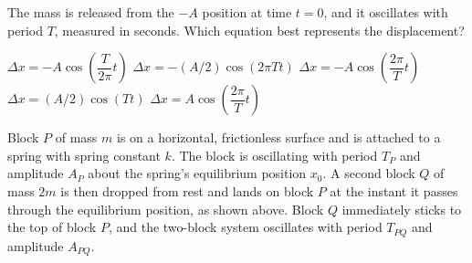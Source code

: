 \documentclass{../../../oss-ap12ibhl-print}
\begin{document}
\begin{questions}
  \question The mass is released from the $-A$ position at time $t=0$, and it
  oscillates with period $T$, measured in seconds. Which equation best
  represents the displacement?
  \label{four}
  \begin{choices}
    \choice $\Delta x = -A\cos\left(\dfrac{T}{2\pi}t\right)$
    \choice $\Delta x = -(A/2)\cos(2\pi T t)$
    \choice $\Delta x = -A\cos\left(\dfrac{2\pi}{T}t\right)$
    \choice $\Delta x = (A/2)\cos(T t)$
    \choice $\Delta x = A\cos\left(\dfrac{2\pi}{T}t\right)$
  \end{choices}
  \newpage
%
%
%
  \question Block $P$ of mass $m$ is on a horizontal, frictionless surface and
  is attached to a spring with spring constant $k$. The block is oscillating
  with period $T_P$ and amplitude $A_P$ about the spring's equilibrium position
  $x_0$. A second block $Q$ of mass $2m$ is then dropped from rest and lands on
  block $P$ at the instant it passes through the equilibrium position, as shown
  above. Block $Q$ immediately sticks to the top of block $P$, and the
  two-block system oscillates with period $T_{PQ}$ and amplitude $A_{PQ}$.
  \newpage


\end{questions}
\end{document}
